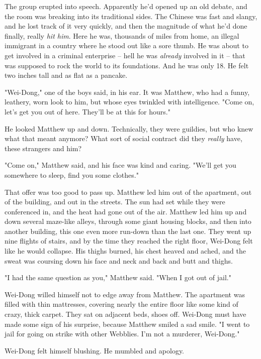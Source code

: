 The group erupted into speech. Apparently he'd opened up an old
debate, and the room was breaking into its traditional sides. The
Chinese was fast and slangy, and he lost track of it very quickly,
and then the magnitude of what he'd done finally, really
\emph{hit him}. Here he was, thousands of miles from home, an
illegal immigrant in a country where he stood out like a sore
thumb. He was about to get involved in a criminal enterprise --
hell he was \emph{already} involved in it -- that was supposed to
rock the world to its foundations. And he was only 18. He felt two
inches tall and as flat as a pancake.

"Wei-Dong," one of the boys said, in his ear. It was Matthew, who
had a funny, leathery, worn look to him, but whose eyes twinkled
with intelligence. "Come on, let's get you out of here. They'll be
at this for hours."

He looked Matthew up and down. Technically, they were guildies, but
who knew what that meant anymore? What sort of social contract did
they \emph{really} have, these strangers and him?

"Come on," Matthew said, and his face was kind and caring. "We'll
get you somewhere to sleep, find you some clothes."

That offer was too good to pass up. Matthew led him out of the
apartment, out of the building, and out in the streets. The sun had
set while they were conferenced in, and the heat had gone out of
the air. Matthew led him up and down several maze-like alleys,
through some giant housing blocks, and then into another building,
this one even more run-down than the last one. They went up nine
flights of stairs, and by the time they reached the right floor,
Wei-Dong felt like he would collapse. His thighs burned, his chest
heaved and ached, and the sweat was coursing down his face and neck
and back and butt and thighs.

"I had the same question as you," Matthew said. "When I got out of
jail."

Wei-Dong willed himself not to edge away from Matthew. The
apartment was filled with thin mattresses, covering nearly the
entire floor like some kind of crazy, thick carpet. They sat on
adjacent beds, shoes off. Wei-Dong must have made some sign of his
surprise, because Matthew smiled a sad smile. "I went to jail for
going on strike with other Webblies. I'm not a murderer,
Wei-Dong."

Wei-Dong felt himself blushing. He mumbled and apology.

